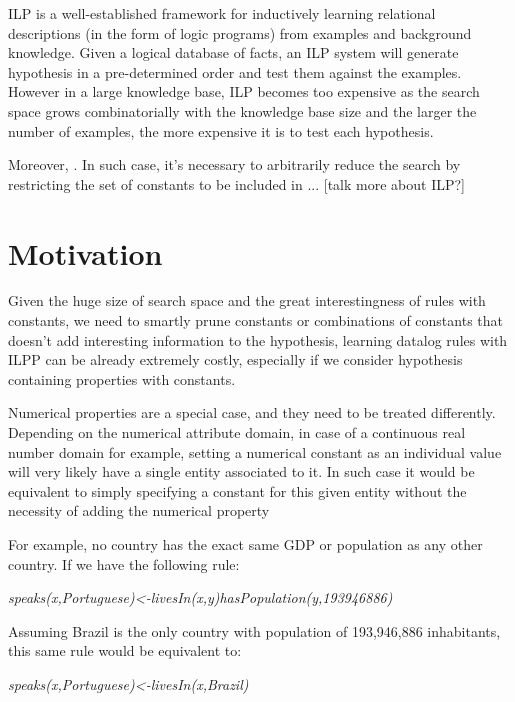 
ILP is a well-established framework for inductively learning relational descriptions (in the form of logic programs)
from examples and background knowledge. Given a logical database of facts, an ILP system will generate hypothesis in a
pre-determined order and test them against the examples. However in a large knowledge base, ILP becomes too expensive as
the search space grows combinatorially with the knowledge base size and the larger the number of examples, the more
expensive it is to test each hypothesis.

Moreover, . In such case, it's necessary to arbitrarily reduce the
search by restricting the set of constants to be included in ... [talk more about ILP?]

\section{Motivation}
Given the huge size of search space and the great interestingness of rules with constants, we need to smartly prune
constants or combinations of constants that doesn't add interesting information to the hypothesis, learning datalog rules with ILPP can be already extremely costly, especially if we consider hypothesis containing properties with constants.

Numerical properties are a special case, and they need to be treated differently. Depending on the numerical attribute
domain, in case of a continuous real number domain for example, setting a numerical constant as an individual value will
very likely have a single entity associated to it. In such case it would be equivalent to simply specifying a constant for this given entity without the necessity of adding the numerical property

For example, no country has the exact same GDP or population as any other country. If we have the following rule:

\begin{center}
 \emph{speaks(x,Portuguese)<-livesIn(x,y)hasPopulation(y,193946886)}
\end{center}

Assuming Brazil is the only country with population of 193,946,886 inhabitants, this same rule would be equivalent to:

\begin{center}
 \emph{speaks(x,Portuguese)<-livesIn(x,Brazil)}
\end{center}

